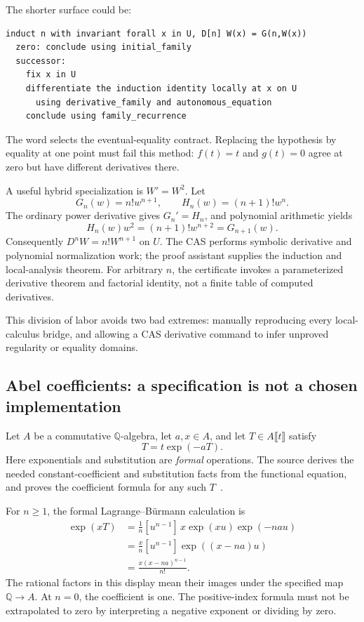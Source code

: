 \documentclass[11pt,a4paper]{article}
\newcommand{\code}[1]{\texttt{\detokenize{#1}}}
\newcommand{\Q}{\mathbb Q}\newcommand{\R}{\mathbb R}
\theoremstyle{remark}\newtheorem{example}[proposition]{Example}
\begin{document}
The shorter surface could be:
\begin{lstlisting}
induct n with invariant forall x in U, D[n] W(x) = G(n,W(x))
  zero: conclude using initial_family
  successor:
    fix x in U
    differentiate the induction identity locally at x on U
      using derivative_family and autonomous_equation
    conclude using family_recurrence
\end{lstlisting}
The word \code{locally} selects the eventual-equality contract. Replacing the hypothesis by equality at one point must fail this method: $f(t)=t$ and $g(t)=0$ agree at zero but have different derivatives there.

A useful hybrid specialization is $W'=W^2$. Let
\[
 G_n(w)=n!w^{n+1},\qquad H_n(w)=(n+1)!w^n.
\]
The ordinary power derivative gives $G_n'=H_n$, and polynomial arithmetic yields
\[
 H_n(w)w^2=(n+1)!w^{n+2}=G_{n+1}(w).
\]
Consequently $D^nW=n!W^{n+1}$ on $U$. The CAS performs symbolic derivative and polynomial normalization work; the proof assistant supplies the induction and local-analysis theorem. For arbitrary $n$, the certificate invokes a parameterized derivative theorem and factorial identity, not a finite table of computed derivatives.

This division of labor avoids two bad extremes: manually reproducing every local-calculus bridge, and allowing a CAS derivative command to infer unproved regularity or equality domains.

\subsection{Abel coefficients: a specification is not a chosen implementation}\label{sec:abelcase}
Let $A$ be a commutative $\Q$-algebra, let $a,x\in A$, and let $T\in A\llbracket t\rrbracket$ satisfy
\[
 T=t\exp(-aT).
\]
Here exponentials and substitution are \emph{formal} operations. The source derives the needed constant-coefficient and substitution facts from the functional equation, and proves the coefficient formula for any such $T$~\cite{abel}.

For $n\geq1$, the formal Lagrange--B\"urmann calculation is
\begin{align*}
 [t^n]\exp(xT)
 &=\frac1n[u^{n-1}]\,x\exp(xu)\exp(-nau)\\
 &=\frac{x}{n}[u^{n-1}]\exp((x-na)u)\\
 &=\frac{x(x-na)^{n-1}}{n!}.
\end{align*}
The rational factors in this display mean their images under the specified map $\Q\to A$. At $n=0$, the coefficient is one. The positive-index formula must not be extrapolated to zero by interpreting a negative exponent or dividing by zero.
\end{document}
